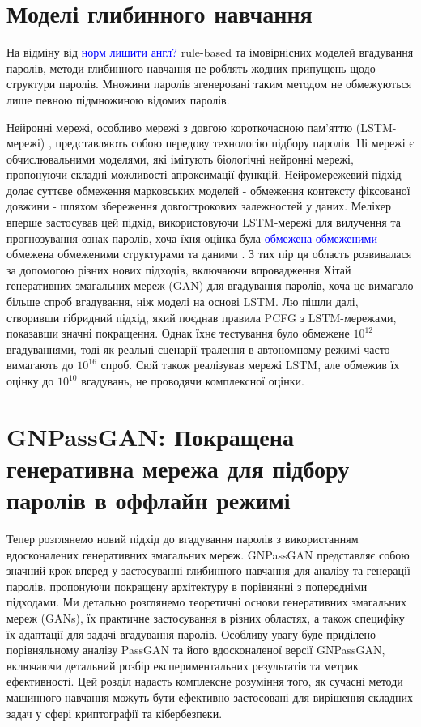 \section{Моделі глибинного навчання}
На відміну від \textcolor{blue}{норм лишити англ?} rule-based та імовірнісних моделей вгадування паролів, методи глибинного навчання не роблять жодних припущень щодо структури паролів. Множини паролів згенеровані таким методом не обмежуються лише певною підмножиною відомих паролів.

Нейронні мережі, особливо мережі з довгою короткочасною пам'яттю (LSTM-мережі) \cite{Long short-term memory}, представляють собою передову технологію підбору паролів. Ці мережі є обчислювальними моделями, які імітують біологічні нейронні мережі, пропонуючи складні можливості апроксимації функцій. Нейромережевий підхід долає суттєве обмеження марковських моделей - обмеження контексту фіксованої довжини - шляхом збереження довгострокових залежностей у даних. Меліхер \cite{Fast lean and accurate: Modeling password guessability using neural networks} вперше застосував цей підхід, використовуючи LSTM-мережі для вилучення та прогнозування ознак паролів, хоча їхня оцінка була \textcolor{blue}{обмежена обмеженими} обмежена обмеженими структурами та даними \cite{Regularizing and optimizing lstm language models}. З тих пір ця область розвивалася за допомогою різних нових підходів, включаючи впровадження Хітай \cite{Passgan: A deep learning approach for password guessing} генеративних змагальних мереж (GAN) для вгадування паролів, хоча це вимагало більше спроб вгадування, ніж моделі на основі LSTM. Лю \cite{Genpass: A general deep learning model for password guessing with pcfg rules and adversarial generation} пішли далі, створивши гібридний підхід, який поєднав правила PCFG з LSTM-мережами, показавши значні покращення. Однак їхнє тестування було обмежене \(10^{12}\) вгадуваннями, тоді як реальні сценарії тралення в автономному режимі часто вимагають до \(10^{16}\) спроб. Сюй \cite{Password guessing based on lstm recurrent neural networks} також реалізував мережі LSTM, але обмежив їх оцінку до \(10^{10}\) вгадувань, не проводячи комплексної оцінки.

\section{GNPassGAN: Покращена генеративна мережа для підбору паролів в оффлайн режимі}
Тепер розглянемо новий підхід до вгадування паролів з використанням вдосконалених генеративних змагальних мереж. GNPassGAN представляє собою значний крок вперед у застосуванні глибинного навчання для аналізу та генерації паролів, пропонуючи покращену архітектуру в порівнянні з попередніми підходами. Ми детально розглянемо теоретичні основи генеративних змагальних мереж (GANs), їх практичне застосування в різних областях, а також специфіку їх адаптації для задачі вгадування паролів. Особливу увагу буде приділено порівняльному аналізу PassGAN та його вдосконаленої версії GNPassGAN, включаючи детальний розбір експериментальних результатів та метрик ефективності. Цей розділ надасть комплексне розуміння того, як сучасні методи машинного навчання можуть бути ефективно застосовані для вирішення складних задач у сфері криптографії та кібербезпеки.

